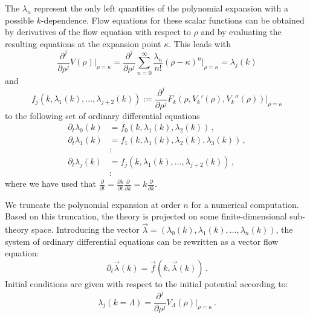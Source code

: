 \documentclass[paper=a4,11pt,bibliography=totoc]{scrartcl}
\begin{document}
The $\lambda_n$ represent the only left quantities of the polynomial expansion with a possible $k$-dependence. Flow equations for these scalar functions can be obtained by derivatives of the flow equation with respect to $\rho$ and by evaluating the resulting equations at the expansion point $\kappa$. This leads with
%
\begin{equation}
\frac{\partial^j}{\partial \rho^j} V(\rho)\bigg|_{\rho=\kappa} = \frac{\partial^j}{\partial \rho^j} \sum_{n=0}^\infty \frac{\lambda_n}{n!}\left(\rho-\kappa\right)^n\bigg|_{\rho=\kappa} = \lambda_j(k)
\end{equation}
%
and
%
\begin{equation}
f_j(k, \lambda_1(k), \ldots, \lambda_{j+2}(k)):= \frac{\partial^j}{\partial \rho^j} F_k\left(\rho, V_k'(\rho), V_k''(\rho)\right)\bigg|_{\rho=\kappa}
\end{equation}
%
to the following set of ordinary differential equations
%
\begin{align}
\partial_t \lambda_0(k) &= f_0(k, \lambda_1(k), \lambda_2(k))\,,\nonumber\\[1ex]
\partial_t \lambda_1(k) &= f_1(k, \lambda_1(k), \lambda_2(k), \lambda_3(k))\,,\nonumber\\[1ex]
&\colon\nonumber\\[1ex]
\partial_t \lambda_j(k) &= f_j(k, \lambda_1(k), \ldots, \lambda_{j+2}(k))\,,\nonumber\\[1ex]
&\colon
\end{align}
%
where we have used that $\frac{\partial}{\partial t}=\frac{\partial k}{\partial t}\frac{\partial}{\partial k}=k \frac{\partial}{\partial k}$.

We truncate the polynomial expansion at order $n$ for a numerical computation. Based on this truncation, the theory is projected on some finite-dimensional sub-theory space. Introducing the vector $\vec{\lambda}=\left(\lambda_0(k), \lambda_1(k), \ldots, \lambda_n(k)\right)$, the system of ordinary differential equations can be rewritten as a vector flow equation:
%
\begin{equation}
\label{eq:vecflowequation}
\partial_t \vec{\lambda}(k) = \vec{f}(k, \vec{\lambda}(k))\,.
\end{equation}
%
Initial conditions are given with respect to the initial potential according to:
%
\begin{equation}
\lambda_j(k=\Lambda) = \frac{\partial^j}{\partial \rho^j} V_\Lambda(\rho)\bigg|_{\rho=\kappa}\,.
\end{equation}
\end{document}
